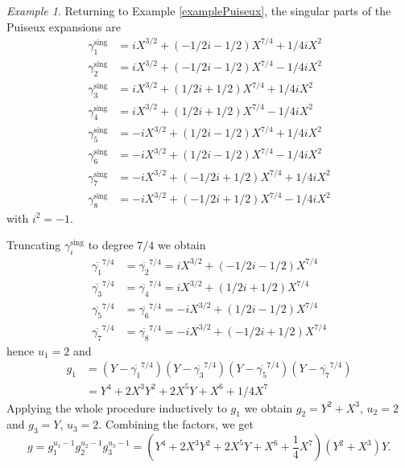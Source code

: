\documentclass[a4paper,11pt]{amsart}%
\theoremstyle{definition}
\theoremstyle{plain}
\theoremstyle{remark}
\newtheorem{example}[defn]{Example}
\begin{document}
\begin{example}
\label{exa:conj-classes} Returning to Example \ref{examplePuiseux}, the
singular parts of the Puiseux expansions are
\begin{align*}
\gamma_{1}^{\operatorname{sing}}  &  =iX^{3/2}+(-1/2i-1/2)X^{7/4}+1/4iX^{2}\\
\gamma_{2}^{\operatorname{sing}}  &  =iX^{3/2}+(-1/2i-1/2)X^{7/4}-1/4iX^{2}\\
\gamma_{3}^{\operatorname{sing}}  &  =iX^{3/2}+(1/2i+1/2)X^{7/4}+1/4iX^{2}\\
\gamma_{4}^{\operatorname{sing}}  &  =iX^{3/2}+(1/2i+1/2)X^{7/4}-1/4iX^{2}\\
\gamma_{5}^{\operatorname{sing}}  &  =-iX^{3/2}+(1/2i-1/2)X^{7/4}+1/4iX^{2}\\
\gamma_{6}^{\operatorname{sing}}  &  =-iX^{3/2}+(1/2i-1/2)X^{7/4}-1/4iX^{2}\\
\gamma_{7}^{\operatorname{sing}}  &  =-iX^{3/2}+(-1/2i+1/2)X^{7/4}+1/4iX^{2}\\
\gamma_{8}^{\operatorname{sing}}  &  =-iX^{3/2}+(-1/2i+1/2)X^{7/4}-1/4iX^{2}%
\end{align*}
with $i^{2}=-1$.

Truncating $\gamma_{i}^{\operatorname{sing}}$ to degree $7/4$ we obtain
\begin{align*}
\overline{\gamma_{1}}^{7/4}  &  =\overline{\gamma_{2}}^{7/4}=iX^{3/2}%
+(-1/2i-1/2)X^{7/4}\\
\overline{\gamma_{3}}^{7/4}  &  =\overline{\gamma_{4}}^{7/4}=iX^{3/2}%
+(1/2i+1/2)X^{7/4}\\
\overline{\gamma_{5}}^{7/4}  &  =\overline{\gamma_{6}}^{7/4}=-iX^{3/2}%
+(1/2i-1/2)X^{7/4}\\
\overline{\gamma_{7}}^{7/4}  &  =\overline{\gamma_{8}}^{7/4}=-iX^{3/2}%
+(-1/2i+1/2)X^{7/4}%
\end{align*}
hence $u_{1}=2$ and%
\begin{align*}
g_{1}  &  =(Y-\overline{\gamma_{1}}^{7/4})(Y-\overline{\gamma_{3}}%
^{7/4})(Y-\overline{\gamma_{5}}^{7/4})(Y-\overline{\gamma_{7}}^{7/4})\\
&  =Y^{4}+2X^{3}Y^{2}+2X^{5}Y+X^{6}+1/4X^{7}%
\end{align*}
Applying the whole procedure inductively to $g_{1}$ we obtain $g_{2}%
=Y^{2}+X^{3}$, $u_{2} = 2$ and $g_{3} = Y$, $u_{3} = 2$. Combining the
factors, we get
\[
g=g_{1}^{u_{1}-1}g_{2}^{u_{2}-1}g_{3}^{u_{3}-1}=\left(  Y^{4}+2X^{3}%
Y^{2}+2X^{5}Y+X^{6}+\frac{1}{4}X^{7}\right)  (Y^{2}+X^{3})Y.
\]

\end{example}
\end{document}
